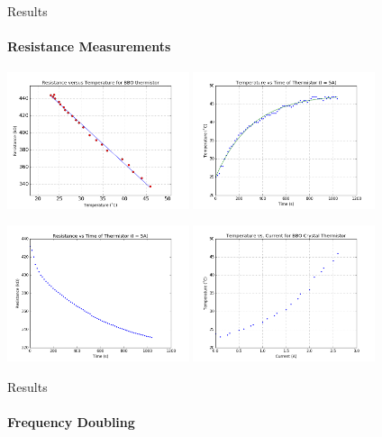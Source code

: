 \documentclass{beamer}
\begin{document}
\begin{frame}{Results}
		\framesubtitle{Resistance Measurements}
		\center
		\includegraphics[width=0.4\textwidth]{Data/bestfitRvT.png}
		\includegraphics[width=0.4\textwidth]{Data/TempFluctFit.png}

		\includegraphics[width=0.4\textwidth]{Data/ResFluct.png}
		\includegraphics[width=0.4\textwidth]{Data/TvsI.png}
\end{frame}



\begin{frame}{Results}
  \framesubtitle{Frequency Doubling}
		\center
\end{frame}
\end{document}
